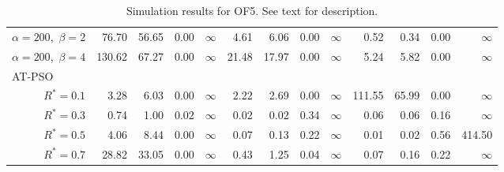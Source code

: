 \documentclass[cmbright]{staauth}
\begin{document}
\begin{table}[ht]
{\begin{tabular}{r|rrrr|rrrr|rrrr}
  $\alpha = 200,$ $\beta =2$ & 76.70 & 56.65 & 0.00 & $\infty$ & 4.61 & 6.06 & 0.00 & $\infty$ & 0.52 & 0.34 & 0.00 & $\infty$ \\
  $\alpha = 200,$ $\beta =4$ & 130.62 & 67.27 & 0.00 & $\infty$ & 21.48 & 17.97 & 0.00 & $\infty$ & 5.24 & 5.82 & 0.00 & $\infty$ \\
\hline
\multicolumn{1}{l|}{AT-PSO} &&&&&&&&&&&&\\
  $R^* = 0.1$ & 3.28 & 6.03 & 0.00 & $\infty$ & 2.22 & 2.69 & 0.00 & $\infty$ & 111.55 & 65.99 & 0.00 & $\infty$ \\
  $R^* = 0.3$ & 0.74 & 1.00 & 0.02 & $\infty$ & 0.02 & 0.02 & 0.34 & $\infty$ & 0.06 & 0.06 & 0.16 & $\infty$ \\
  $R^* = 0.5$ & 4.06 & 8.44 & 0.00 & $\infty$ & 0.07 & 0.13 & 0.22 & $\infty$ & 0.01 & 0.02 & 0.56 & 414.50 \\
  $R^* = 0.7$ & 28.82 & 33.05 & 0.00 & $\infty$ & 0.43 & 1.25 & 0.04 & $\infty$ & 0.07 & 0.16 & 0.22 & $\infty$ \\
   \hline
\end{tabular}
}
\caption{Simulation results for OF5. See text for description.}
\label{tab:psosim5}
\end{table}
\end{document}
